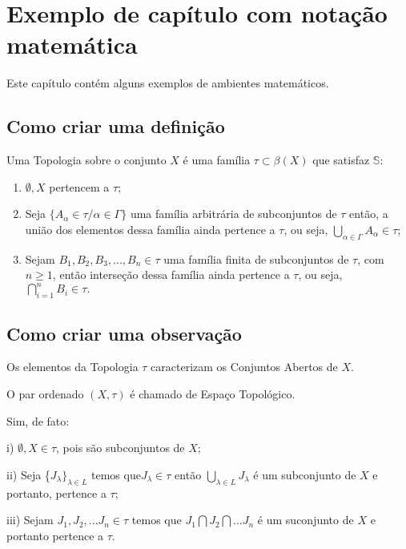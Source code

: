 \chapter[Exemplo de capítulo com notação matemática]{Exemplo de capítulo com notação matemática}

Este capítulo contém alguns exemplos de ambientes matemáticos.

\section{Como criar uma definição}

\begin{defi}
Uma Topologia sobre o conjunto $X$ é uma família $\tau
\subset \beta(X)$ que satisfaz $ \mathbb{S} $:
\begin{enumerate}
 \item$\emptyset,X$ pertencem a $\tau;$
 \item Seja  $\{A_{\alpha} \in \tau /\alpha \in \Gamma\}$
 uma família arbitrária de subconjuntos de  $\tau$ então, a união dos elementos dessa família ainda pertence a  $\tau$, ou seja, $\bigcup \limits_{\alpha \in \Gamma} A_{\alpha}\in\tau;$
 \item Sejam $B_{1},B_{2},B_{3},..., B_{n} \in \tau$ uma família finita de subconjuntos de $\tau$, com $n \geq 1$, então
 interseção dessa família ainda pertence a $\tau$, ou seja, $\bigcap\limits_{i=1}^{n} B_{i}\in \tau.$
\end{enumerate}
\end{defi}

\section{Como criar uma observação}

\begin{obs}

\item Os elementos da Topologia  $\tau$ caracterizam os Conjuntos Abertos de $X.$

\item O par ordenado $(X,\tau)$ é chamado de Espaço Topológico.

\item Sim, de fato:

\item i) $\emptyset, X \in \tau$, pois são subconjuntos de $X;$

\item ii) Seja \{$J_{\lambda}\}_{\lambda\in L}$ temos que$J_{\lambda}\in \tau$ então $\bigcup\limits_{\lambda\in L} J_{\lambda}$ é
    um subconjunto de $X$ e portanto, pertence a $\tau;$

\item iii) Sejam $J_{1},J_{2},...J_{n} \in \tau$ temos que $J_{1}\bigcap J_{2}\bigcap ...J_{n}$ é um suconjunto de $X$ e portanto pertence a $\tau.$

\end{obs}

